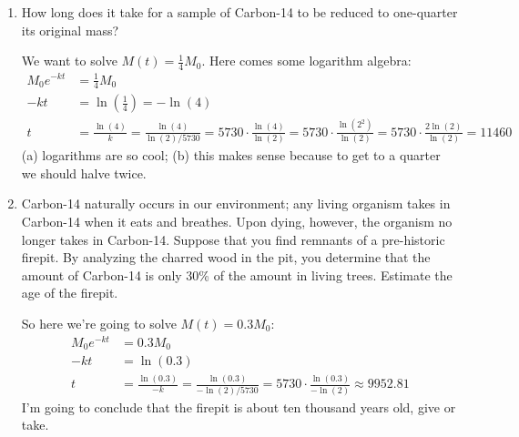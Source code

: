 \documentclass[10pt]{article}
\newenvironment{red}{\color{red}}{\ignorespacesafterend}
\begin{document}
\begin{enumerate}[leftmargin=0pt]
\begin{enumerate}
    \begin{red}
    From this information I know that $M(5730) = \frac12 M_0$. Therefore,
    \begin{align*}
        M_0e^{-k\cdot5730} &= \frac12 M_0 \\
        -k\cdot5730 &= \ln\left(\frac12\right) = -\ln(2) \\
        k &= \frac{\ln(2)}{5730}
    \end{align*}
    (So: in general, for a radioisotope with a half-life of $h$ years, the value of $k$ works out to be $\tfrac{\ln(2)}{h}$.)
    \end{red}
    \item How long does it take for a sample of Carbon-14 to be reduced to one-quarter its original mass?
    
    \begin{red}
    We want to solve $M(t) = \frac14 M_0$. Here comes some logarithm algebra:
    \begin{align*}
        M_0 e^{-kt} &= \frac14 M_0 \\
        -kt &= \ln\left(\frac14\right) = -\ln(4) \\
        t &= \frac{\ln(4)}{k} = \frac{\ln(4)}{\ln(2) / 5730} 
        = 5730\cdot \frac{\ln(4)}{\ln(2)} 
        = 5730\cdot \frac{\ln(2^2)}{\ln(2)} 
        = 5730\cdot \frac{2\ln(2)}{\ln(2)} 
        = 11460
    \end{align*}
    (a) logarithms are so cool; (b) this makes sense because to get to a quarter we should halve twice.
    \end{red}
    \item Carbon-14 naturally occurs in our environment; any living organism takes in Carbon-14 when it eats and breathes. Upon dying, however, the organism no longer takes in Carbon-14. Suppose that you find remnants of a pre-historic firepit. By analyzing the charred wood in the pit, you determine that the amount of Carbon-14 is only 30\% of the amount in living trees. Estimate the age of the firepit.
    
    \begin{red}
    So here we're going to solve $M(t) = 0.3M_0$:
    \begin{align*}
        M_0 e^{-kt} &= 0.3 M_0 \\
        -kt &= \ln(0.3) \\
        t &= \frac{\ln(0.3)}{-k} = \frac{\ln(0.3)}{-\ln(2)/5730} = 5730\cdot \frac{\ln(0.3)}{-\ln(2)} \approx 9952.81
    \end{align*}
    I'm going to conclude that the firepit is about ten thousand years old, give or take.
    \end{red}
\end{enumerate}


\end{enumerate}
\end{document}
